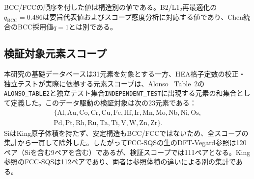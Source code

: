 \documentclass[5p,10pt]{elsarticle}
\begin{document}
\begin{table}[H]
\centering
\caption{本稿で用いる予測モデルの早見表。SQS-BCCとL1$_2$-FCCはChen統合スクリーニングに用いる採用モデルであり、B2/L1$_2$+Kingは要旨・独立テスト表の代表値（RMSE $= 0.0155$~\AA{}、Vegard比23.3\%改善）を与えるモデルである。感度解析行は参照体積依存性の評価に用いる。}
\label{tab:adopted_models}
\scriptsize
{}
\par\smallskip
{\scriptsize BCC/FCCの順序を付した値は構造別の値である。B2/L1$_2$再最適化の$q_\text{BCC}=0.486$は要旨代表値およびスコープ感度分析に対応する値であり、Chen統合のBCC採用値$q=1$とは別である。}
\end{table}

\subsection{検証対象元素スコープ}
\label{sec:element_scope}

本研究の基礎データベースは31元素を対象とする一方、HEA格子定数の校正・独立テストが実際に依拠する元素スコープは、Alonso~\cite{Alonso2021} Table~2の
\texttt{ALONSO\_TABLE2}と独立テスト集合\texttt{INDEPENDENT\_TEST}に出現する元素の和集合として定義した。このデータ駆動の検証対象は次の23元素である：
\[
\begin{gathered}
\{\mathrm{Al,Au,Co,Cr,Cu,Fe,Hf,Ir,Mn,Mo,Nb,Ni,Os,}\\
\mathrm{Pd,Pt,Rh,Ru,Ta,Ti,V,W,Zn,Zr}\}.
\end{gathered}
\]
SiはKing原子体積を持たず、安定構造もBCC/FCCではないため、全スコープの集計から一貫して除外した。したがってFCC-SQSの生のDFT-Vegard参照は120ペア（Siを含む9ペアを含む）であるが、検証スコープでは111ペアとなる。King参照のFCC-SQSは112ペアであり、両者は参照体積の違いによる別の集計である。
\end{document}
